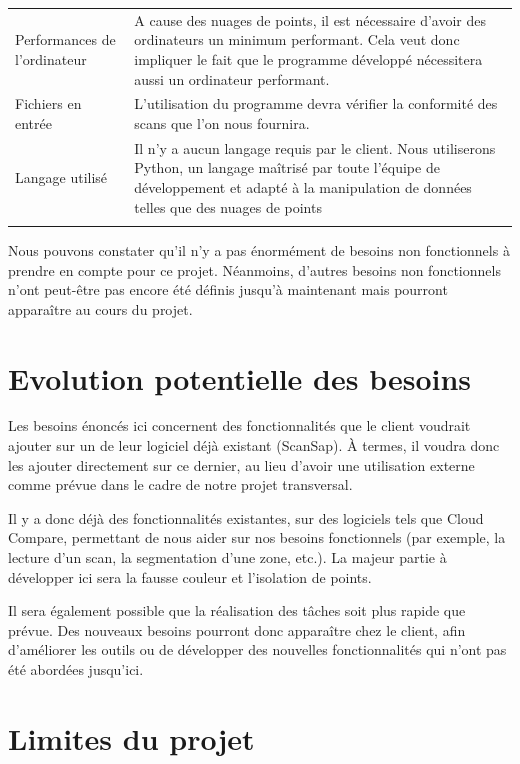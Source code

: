 \documentclass[12pt,titlepage,french]{article}
\begin{document}
\noindent\begin{tabu} to \textwidth {X[c]X[c3]}\toprule
{}&\\\toprule
Performances de l'ordinateur
& A cause des nuages de points, il est nécessaire d'avoir des ordinateurs un minimum performant. Cela veut donc impliquer le fait que le programme développé nécessitera aussi un ordinateur performant.\\\midrule
Fichiers en entrée
& L'utilisation du programme devra vérifier la conformité des scans que l'on nous fournira.\\\midrule
Langage utilisé
& Il n'y a aucun langage requis par le client. Nous utiliserons Python, un langage maîtrisé par toute l'équipe de développement et adapté à la manipulation de données telles que des nuages de points\\\bottomrule \\
\end{tabu}

Nous pouvons constater qu'il n'y a pas énormément de besoins non fonctionnels à prendre en compte pour ce projet. Néanmoins, d'autres besoins non fonctionnels n'ont peut-être pas encore été définis jusqu'à maintenant mais pourront apparaître au cours du projet.

\section{Evolution potentielle des besoins}

Les besoins énoncés ici concernent des fonctionnalités que le client voudrait ajouter sur un de leur logiciel déjà existant (ScanSap). À termes, il voudra donc les ajouter directement sur ce dernier, au lieu d'avoir une utilisation externe comme prévue dans le cadre de notre projet transversal.

Il y a donc déjà des fonctionnalités existantes, sur des logiciels tels que Cloud Compare, permettant de nous aider sur nos besoins fonctionnels (par exemple, la lecture d'un scan, la segmentation d'une zone, etc.). La majeur partie à développer ici sera la fausse couleur et l'isolation de points.

Il sera également possible que la réalisation des tâches soit plus rapide que prévue. Des nouveaux besoins pourront donc apparaître chez le client, afin d'améliorer les outils ou de développer des nouvelles fonctionnalités qui n'ont pas été abordées jusqu'ici.


\section{Limites du projet}
\end{document}
